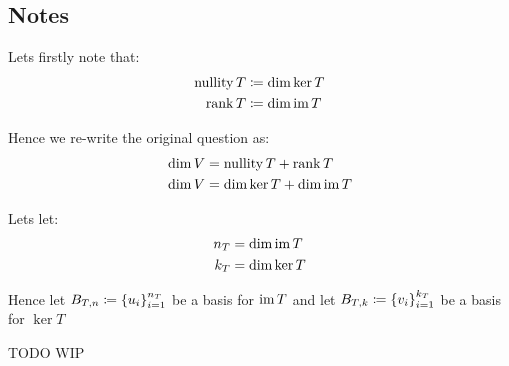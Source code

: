 \documentclass[../main.tex]{subfiles}
\begin{document}
\subsection*{Notes}



Lets firstly note that:
\begin{align}
  \operatorname{nullity} T &\coloneqq \dim \operatorname{ker} T \\ 
  \operatorname{rank} T &\coloneqq \dim \operatorname{im} T
\end{align}


Hence we re-write the original question as:
\begin{align}
  \dim V &= \operatorname{nullity} T + \operatorname{rank} T \\ 
  \dim V &= \dim \operatorname{ker} T + \dim \operatorname{im} T 
\end{align}

Lets let: 
\begin{align}
  n_T &= \dim \operatorname{im} T \\
  k_T &= \dim \ker T 
\end{align}

Hence let \( B_{T, n} \coloneqq  \left\{ u_i \right\}_{i=1}^{n_T} \) be a basis for \( \operatorname{im} T \) and let \( B_{T, k} \coloneqq  \left\{ v_i \right\}_{i=1}^{k_T} \) be a basis for \(\ker T \)

TODO WIP 
\end{document}
